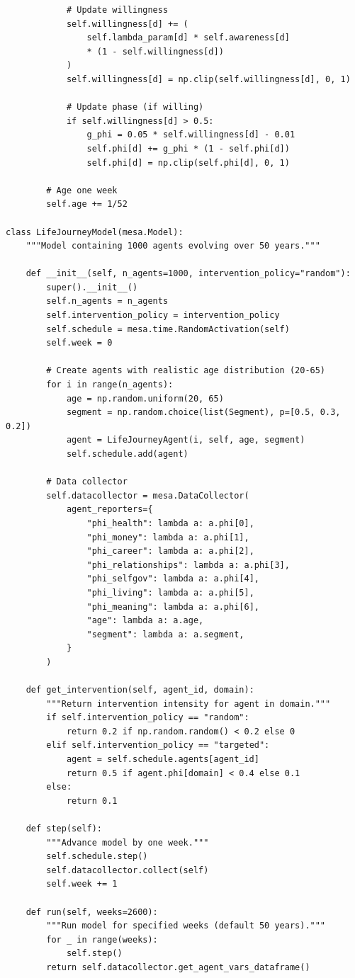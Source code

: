 \begin{verbatim}
            # Update willingness
            self.willingness[d] += (
                self.lambda_param[d] * self.awareness[d]
                * (1 - self.willingness[d])
            )
            self.willingness[d] = np.clip(self.willingness[d], 0, 1)

            # Update phase (if willing)
            if self.willingness[d] > 0.5:
                g_phi = 0.05 * self.willingness[d] - 0.01
                self.phi[d] += g_phi * (1 - self.phi[d])
                self.phi[d] = np.clip(self.phi[d], 0, 1)

        # Age one week
        self.age += 1/52

class LifeJourneyModel(mesa.Model):
    """Model containing 1000 agents evolving over 50 years."""

    def __init__(self, n_agents=1000, intervention_policy="random"):
        super().__init__()
        self.n_agents = n_agents
        self.intervention_policy = intervention_policy
        self.schedule = mesa.time.RandomActivation(self)
        self.week = 0

        # Create agents with realistic age distribution (20-65)
        for i in range(n_agents):
            age = np.random.uniform(20, 65)
            segment = np.random.choice(list(Segment), p=[0.5, 0.3, 0.2])
            agent = LifeJourneyAgent(i, self, age, segment)
            self.schedule.add(agent)

        # Data collector
        self.datacollector = mesa.DataCollector(
            agent_reporters={
                "phi_health": lambda a: a.phi[0],
                "phi_money": lambda a: a.phi[1],
                "phi_career": lambda a: a.phi[2],
                "phi_relationships": lambda a: a.phi[3],
                "phi_selfgov": lambda a: a.phi[4],
                "phi_living": lambda a: a.phi[5],
                "phi_meaning": lambda a: a.phi[6],
                "age": lambda a: a.age,
                "segment": lambda a: a.segment,
            }
        )

    def get_intervention(self, agent_id, domain):
        """Return intervention intensity for agent in domain."""
        if self.intervention_policy == "random":
            return 0.2 if np.random.random() < 0.2 else 0
        elif self.intervention_policy == "targeted":
            agent = self.schedule.agents[agent_id]
            return 0.5 if agent.phi[domain] < 0.4 else 0.1
        else:
            return 0.1

    def step(self):
        """Advance model by one week."""
        self.schedule.step()
        self.datacollector.collect(self)
        self.week += 1

    def run(self, weeks=2600):
        """Run model for specified weeks (default 50 years)."""
        for _ in range(weeks):
            self.step()
        return self.datacollector.get_agent_vars_dataframe()
\end{verbatim}

